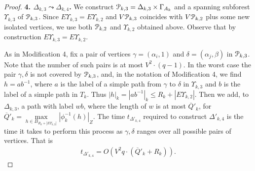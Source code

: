 \documentclass[a4paper,12pt]{article}
\renewcommand{\a}{\alpha }
\renewcommand{\b}{\beta }
\newcommand{\G}{\Gamma }
\newcommand{\g}{\gamma }
\newcommand{\D}{\Delta }
\renewcommand{\d}{\delta }
\newcommand{\U}{\Upsilon }
\newcommand{\cP}{{\cal{P}}}
\numberwithin{equation}{section}
\numberwithin{figure}{section}
\begin{document}
\begin{proof}
{\bf 4. $\D_{k,3} \leadsto \D_{k,4}$.}
We construct $\cP_{k,3}=\D_{k,3}\times
\G_{A_k}$ and a
spanning subforest $\U_{k,3}$ of $\cP_{k,3}$. Since $E\U_{k,3} =
E\U_{k,2}$ and $V\cP_{k,3}$ coincides with $V\cP_{k,2}$ plus some new isolated
vertices, we use both $\cP_{k,2}$ and $\U_{k,2}$ obtained above. Observe that by construction $E\U_{k,3} =
E\U_{k,2}$.

As in Modification 4, fix a pair of vertices $\g=(\a_i,1)$ and
$\d=(\a_j,\b)$ in $\cP_{k,3}$. Note that the number of such pairs is
at most $V^2 \cdot (q-1)$. In the worst case the pair $\g, \d$ is
not covered by $\cP_{k,3}$, and, in the notation of Modification 4, we
find $h=ab^{-1}$, where $a$ is the label of a simple path from
$\g$ to $\d$ in $\U_{k,3}$ and $b$ is the label of a simple path in
$T_k$. Thus $|h|_k = |ab^{-1}|_k \le R_k+ | E\U_{k,2}|$.  Then we add,
to $\D_{k,3}$, a path with label $wb$, where the length of $w$ is
 at most $\overline{Q}'_k$, for
$\overline{Q}'_k=\max\limits_{h \in B_{R_k+|
E\U_{k,2}|}}|\phi^{-1}_k(h)|_Z$.
The time $t_{\D'_{k,4}}$ required to construct $\D'_{k,4}$ is the time
it takes to perform this process as $\g,\d$ ranges over all
possible pairs of vertices. That is
\begin{equation}\label{theta'4}
\begin{split}
t_{\D'_{k,4}} =
 O(V^2 q \cdot(\overline{Q}'_k+R_k)).
\end{split}
\end{equation}


\end{proof}
\end{document}
